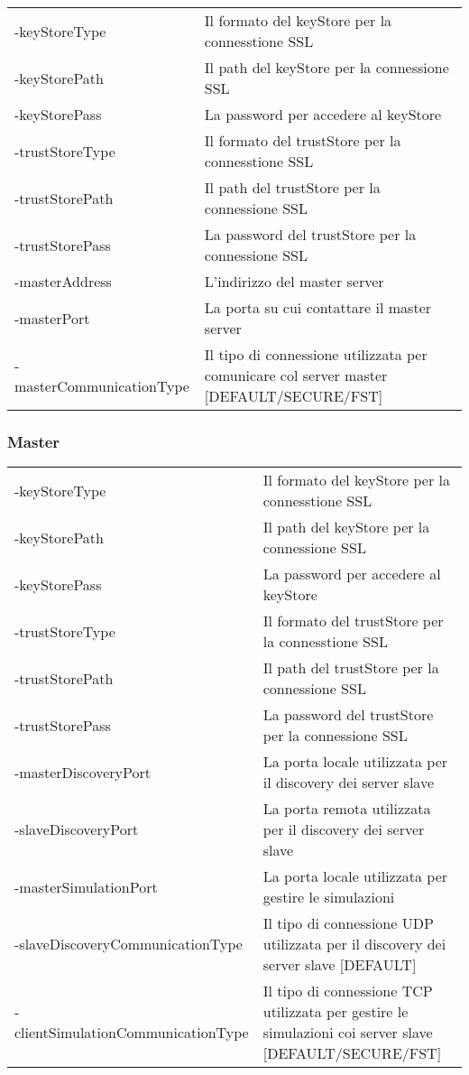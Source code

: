\begin{table}[H]
    \begin{tabularx}{\linewidth}{ l X }
    -keyStoreType   & Il formato del keyStore per la connesstione SSL   \\
    -keyStorePath   & Il path del keyStore per la connessione SSL       \\
    -keyStorePass   & La password per accedere al keyStore              \\
    -trustStoreType & Il formato del trustStore per la connesstione SSL \\
    -trustStorePath & Il path del trustStore per la connessione SSL     \\
    -trustStorePass & La password del trustStore per la connessione SSL \\
    -masterAddress  & L'indirizzo del master server                     \\
    -masterPort     & La porta su cui contattare il master server       \\
    -masterCommunicationType & Il tipo di connessione utilizzata per comunicare col server master {[}DEFAULT/SECURE/FST{]}
    \end{tabularx}
\end{table}

\subsubsection{Master}

\begin{table}[H]
    \begin{tabularx}{\linewidth}{ l X }
    -keyStoreType         & Il formato del keyStore per la connesstione SSL              \\
    -keyStorePath         & Il path del keyStore per la connessione SSL                  \\
    -keyStorePass         & La password per accedere al keyStore                         \\
    -trustStoreType       & Il formato del trustStore per la connesstione SSL            \\
    -trustStorePath       & Il path del trustStore per la connessione SSL                \\
    -trustStorePass       & La password del trustStore per la connessione SSL            \\
    -masterDiscoveryPort  & La porta locale utilizzata per il discovery dei server slave \\
    -slaveDiscoveryPort   & La porta remota utilizzata per il discovery dei server slave \\
    -masterSimulationPort & La porta locale utilizzata per gestire le simulazioni        \\
    -slaveDiscoveryCommunicationType   & Il tipo di connessione UDP utilizzata per il discovery dei server slave {[}DEFAULT{]}     \\
    -clientSimulationCommunicationType & Il tipo di connessione TCP utilizzata per gestire le simulazioni coi server slave {[}DEFAULT/SECURE/FST{]}
    \end{tabularx}
\end{table}

